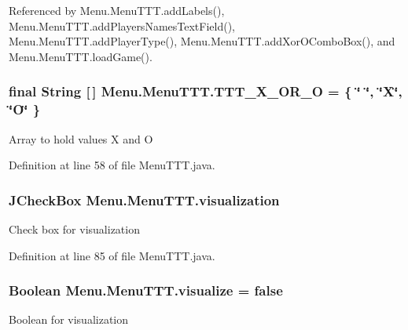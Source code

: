 Referenced by Menu.\+Menu\+T\+T\+T.\+add\+Labels(), Menu.\+Menu\+T\+T\+T.\+add\+Players\+Names\+Text\+Field(), Menu.\+Menu\+T\+T\+T.\+add\+Player\+Type(), Menu.\+Menu\+T\+T\+T.\+add\+Xor\+O\+Combo\+Box(), and Menu.\+Menu\+T\+T\+T.\+load\+Game().

\hypertarget{class_menu_1_1_menu_t_t_t_a05b9b5552eecd3dd9b969a21817f9789}{}
\subsubsection[{T\+T\+T\+\_\+\+X\+\_\+\+O\+R\+\_\+\+O}]{\setlength{\rightskip}{0pt plus 5cm}final String \mbox{[}$\,$\mbox{]} Menu.\+Menu\+T\+T\+T.\+T\+T\+T\+\_\+\+X\+\_\+\+O\+R\+\_\+\+O = \{ \char`\"{} \char`\"{}, \char`\"{}X\char`\"{}, \char`\"{}O\char`\"{} \}\hspace{0.3cm}{\ttfamily [private]}}\label{class_menu_1_1_menu_t_t_t_a05b9b5552eecd3dd9b969a21817f9789}
Array to hold values X and O 

Definition at line 58 of file Menu\+T\+T\+T.\+java.

\hypertarget{class_menu_1_1_menu_t_t_t_a611b82f2267f9ccb007b1ee5744e3088}{}
\subsubsection[{visualization}]{\setlength{\rightskip}{0pt plus 5cm}J\+Check\+Box Menu.\+Menu\+T\+T\+T.\+visualization\hspace{0.3cm}{\ttfamily [private]}}\label{class_menu_1_1_menu_t_t_t_a611b82f2267f9ccb007b1ee5744e3088}
Check box for visualization 

Definition at line 85 of file Menu\+T\+T\+T.\+java.

\hypertarget{class_menu_1_1_menu_t_t_t_a9d69fa1e5f80800c37ee3c47925f3f14}{}
\subsubsection[{visualize}]{\setlength{\rightskip}{0pt plus 5cm}Boolean Menu.\+Menu\+T\+T\+T.\+visualize = false\hspace{0.3cm}{\ttfamily [private]}}\label{class_menu_1_1_menu_t_t_t_a9d69fa1e5f80800c37ee3c47925f3f14}
Boolean for visualization 

